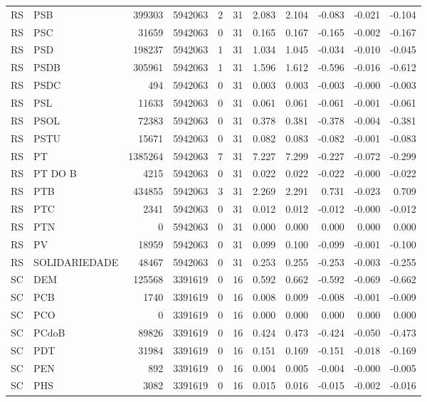 \begin{landscape}
\begin{longtable}{llrrrrrrrrr}
RS & PSB & 399303 & 5942063 & 2 & 31 & 2.083 & 2.104 & -0.083 & -0.021 & -0.104 \\
RS & PSC & 31659 & 5942063 & 0 & 31 & 0.165 & 0.167 & -0.165 & -0.002 & -0.167 \\
RS & PSD & 198237 & 5942063 & 1 & 31 & 1.034 & 1.045 & -0.034 & -0.010 & -0.045 \\
RS & PSDB & 305961 & 5942063 & 1 & 31 & 1.596 & 1.612 & -0.596 & -0.016 & -0.612 \\
RS & PSDC & 494 & 5942063 & 0 & 31 & 0.003 & 0.003 & -0.003 & -0.000 & -0.003 \\
RS & PSL & 11633 & 5942063 & 0 & 31 & 0.061 & 0.061 & -0.061 & -0.001 & -0.061 \\
RS & PSOL & 72383 & 5942063 & 0 & 31 & 0.378 & 0.381 & -0.378 & -0.004 & -0.381 \\
RS & PSTU & 15671 & 5942063 & 0 & 31 & 0.082 & 0.083 & -0.082 & -0.001 & -0.083 \\
RS & PT & 1385264 & 5942063 & 7 & 31 & 7.227 & 7.299 & -0.227 & -0.072 & -0.299 \\
RS & PT DO B & 4215 & 5942063 & 0 & 31 & 0.022 & 0.022 & -0.022 & -0.000 & -0.022 \\
RS & PTB & 434855 & 5942063 & 3 & 31 & 2.269 & 2.291 & 0.731 & -0.023 & 0.709 \\
RS & PTC & 2341 & 5942063 & 0 & 31 & 0.012 & 0.012 & -0.012 & -0.000 & -0.012 \\
RS & PTN & 0 & 5942063 & 0 & 31 & 0.000 & 0.000 & 0.000 & 0.000 & 0.000 \\
RS & PV & 18959 & 5942063 & 0 & 31 & 0.099 & 0.100 & -0.099 & -0.001 & -0.100 \\
RS & SOLIDARIEDADE & 48467 & 5942063 & 0 & 31 & 0.253 & 0.255 & -0.253 & -0.003 & -0.255 \\
SC & DEM & 125568 & 3391619 & 0 & 16 & 0.592 & 0.662 & -0.592 & -0.069 & -0.662 \\
SC & PCB & 1740 & 3391619 & 0 & 16 & 0.008 & 0.009 & -0.008 & -0.001 & -0.009 \\
SC & PCO & 0 & 3391619 & 0 & 16 & 0.000 & 0.000 & 0.000 & 0.000 & 0.000 \\
SC & PCdoB & 89826 & 3391619 & 0 & 16 & 0.424 & 0.473 & -0.424 & -0.050 & -0.473 \\
SC & PDT & 31984 & 3391619 & 0 & 16 & 0.151 & 0.169 & -0.151 & -0.018 & -0.169 \\
SC & PEN & 892 & 3391619 & 0 & 16 & 0.004 & 0.005 & -0.004 & -0.000 & -0.005 \\
SC & PHS & 3082 & 3391619 & 0 & 16 & 0.015 & 0.016 & -0.015 & -0.002 & -0.016 \\

\end{longtable}
\end{landscape}

